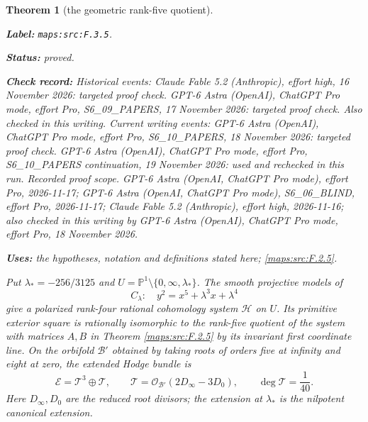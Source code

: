 \documentclass[11pt,a4paper]{article}
\newtheorem{theorem}{Theorem}[section]
\theoremstyle{definition}
\newcommand{\StatementRecord}[4]{\par\smallskip\begingroup\upshape\raggedright\noindent\textbf{Label:} \nolinkurl{#1}.\par\noindent\textbf{Status:} #2.\par\noindent\textbf{Check record:} #3.\par\noindent\textbf{Uses:} #4.\par\endgroup\smallskip}
\begin{document}
\begin{theorem}[the geometric rank-five quotient]\label{maps:src:F.3.5}
\StatementRecord{maps:src:F.3.5}{proved}{Historical events: Claude Fable 5.2 (Anthropic), effort high, 16 November 2026: targeted proof check. GPT-6 Astra (OpenAI), ChatGPT Pro mode, effort Pro, S6\_09\_PAPERS, 17 November 2026: targeted proof check. Also checked in this writing. Current writing events: GPT-6 Astra (OpenAI), ChatGPT Pro mode, effort Pro, S6\_10\_PAPERS, 18 November 2026: targeted proof check. GPT-6 Astra (OpenAI), ChatGPT Pro mode, effort Pro, S6\_10\_PAPERS continuation, 19 November 2026: used and rechecked in this run. \emph{Recorded proof scope.} GPT-6 Astra (OpenAI, ChatGPT Pro mode), effort Pro, 2026-11-17; GPT-6 Astra (OpenAI, ChatGPT Pro mode), S6\_06\_BLIND, effort Pro, 2026-11-17; Claude Fable 5.2 (Anthropic), effort high, 2026-11-16; also checked in this writing by GPT-6 Astra (OpenAI), ChatGPT Pro mode, effort Pro, 18 November 2026}{the hypotheses, notation and definitions stated here; \cref{maps:src:F.2.5}}


Put $\lambda_*=-256/3125$ and
$U=\mathbb P^1\setminus\{0,\infty,\lambda_*\}$.  The smooth projective
models of
\[
 C_\lambda:\quad y^2=x^5+\lambda^3x+\lambda^4
 \tag{F.7}\label{maps:eq:F.7}
\]
give a polarized rank-four rational cohomology system $\mathcal H$ on
$U$.  Its primitive exterior square is rationally isomorphic to
the rank-five quotient of the system with matrices $A,B$ in
Theorem \ref{maps:src:F.2.5} by its invariant first coordinate line.
On the orbifold $\mathcal B'$ obtained by taking roots of orders
five at infinity and eight at zero, the extended Hodge bundle is
\[
 \mathcal E=\mathcal T^3\oplus\mathcal T,\qquad
 \mathcal T=\mathcal O_{\mathcal B'}(2D_\infty-3D_0),\qquad
 \deg\mathcal T=\frac1{40}.
 \tag{F.8}\label{maps:eq:F.8}
\]
Here $D_\infty,D_0$ are the reduced root divisors; the extension at
$\lambda_*$ is the nilpotent canonical extension.

\end{theorem}
\end{document}
